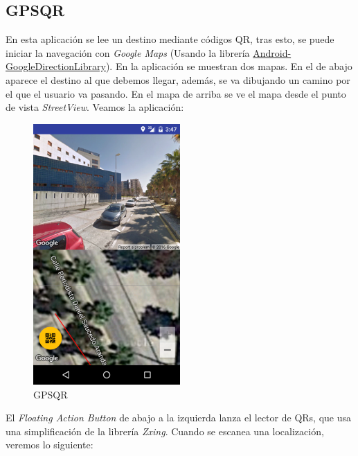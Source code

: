 \documentclass[	DIV=calc,%
							paper=a4,%
							fontsize=11pt]{scrartcl}	 					%
\begin{document}
\subsection{GPSQR}\label{gpsqr}

En esta aplicación se lee un destino mediante códigos QR, tras esto, se
puede iniciar la navegación con \emph{Google Maps} (Usando la librería
\href{https://github.com/akexorcist/Android-GoogleDirectionLibrary}{Android-GoogleDirectionLibrary}).
En la aplicación se muestran dos mapas. En el de abajo aparece el
destino al que debemos llegar, además, se va dibujando un camino por el
que el usuario va pasando. En el mapa de arriba se ve el mapa desde el
punto de vista \emph{StreetView}. Veamos la aplicación:

\begin{figure}[H]
\centering
\includegraphics[width=0.5\textwidth]{./img/gpsQr.png}
\caption{GPSQR}
\end{figure}

El \emph{Floating Action Button} de abajo a la izquierda lanza el lector
de QRs, que usa una simplificación de la librería \emph{Zxing}. Cuando
se escanea una localización, veremos lo siguiente:
\end{document}
